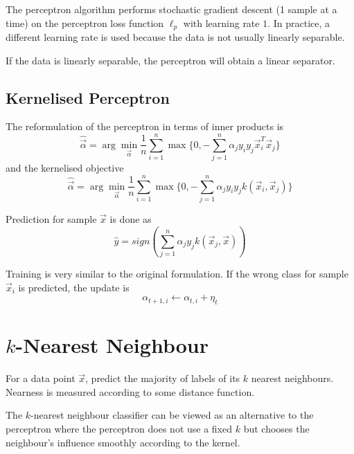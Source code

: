 The perceptron algorithm performs stochastic gradient descent
(1 sample at a time) on the perceptron loss function
$\ell_p$ with learning rate $1$.
In practice, a different learning rate is used
because the data is not usually linearly separable.

\begin{theorem}
	If the data is linearly separable, the perceptron will obtain
	a linear separator.
\end{theorem}


\subsection{Kernelised Perceptron}
The reformulation of the perceptron in terms of inner
products is
\begin{equation*}
\hat{\vec{\alpha}} = \arg\min_{\vec{\alpha}}{
	\frac{1}{n}
	\sum_{i=1}^n{\max\{
		0, -\sum_{j=1}^n{\alpha_j y_i y_j \vec{x}_i^T \vec{x}_j}
		\}}
}
\end{equation*}
and the kernelised objective
\begin{equation*}
\hat{\vec{\alpha}} = \arg\min_{\vec{\alpha}}{
	\frac{1}{n}
	\sum_{i=1}^n{\max\{
		0, -\sum_{j=1}^n{\alpha_j y_i y_j k(\vec{x}_i, \vec{x}_j)}
		\}}
}
\end{equation*}

Prediction for sample $\vec{x}$ is done as
\begin{equation*}
\hat{y} = sign\left(
\sum_{j=1}^n{\alpha_j y_j k(\vec{x}_j, \vec{x})}
\right)
\end{equation*}

Training is very similar to the original formulation.
If the wrong class for sample $\vec{x}_i$ is predicted,
the update is
\begin{equation*}
\alpha_{t+1, i} \gets \alpha_{t, i} + \eta_t
\end{equation*}


\section{$k$-Nearest Neighbour}
For a data point $\vec{x}$,
predict the majority of labels of its
$k$ nearest neighbours.
Nearness is measured according to some
distance function.

The $k$-nearest neighbour classifier can be
viewed as an alternative to the perceptron
where the perceptron does not use a fixed
$k$ but chooses the neighbour's influence
smoothly according to the kernel.

